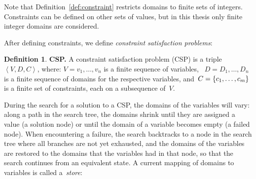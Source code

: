 \documentclass[a4paper,11pt]{article}
\theoremstyle{definition}
\newtheorem{definition}{Definition}
\numberwithin{equation}{section}
\begin{document}
Note that Definition~\ref{def:constraint} restricts domains to
finite sets of integers. Constraints can be defined on
other sets of values, but in this thesis only finite integer domains
are considered.

After defining constraints, we define \emph{constraint satisfaction problems}:

\begin{definition}
  \textbf{CSP.} A constraint satisfaction problem (CSP) is a
  triple~$\left<V,D,C\right>$, where:
  $V = v_1, \ldots, v_n$ is a finite sequence of variables,
  ~$D = D_1, \ldots, D_n$ is a finite sequence of domains for the respective variables,
  and~$C = \left\{c_1, \ldots, c_m\right\}$ is a finite set of constraints,
  each on a subsequence of~$V$.
\end{definition}

During the search for a solution to a CSP, the domains of the variables will vary:
along a path in the search tree, the domains shrink
until they are assigned a value (a solution node) or until the domain
of a variable becomes empty (a failed node).
When encountering a failure, the search backtracks to a node in the search tree
where all branches are not yet exhausted,
and the domains of the variables are restored to the domains that the variables
had in that node, so that the search continues from an equivalent state.
A current mapping of domains to variables is called a~\emph{store}:
\end{document}
